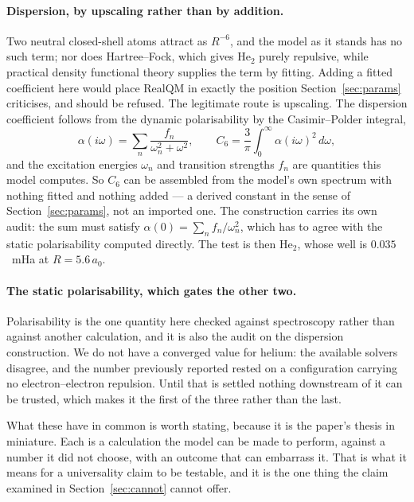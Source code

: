 \documentclass[11pt]{article}
\begin{document}
\paragraph{Dispersion, by upscaling rather than by addition.} Two neutral closed-shell atoms
attract as $R^{-6}$, and the model as it stands has no such term; nor does Hartree--Fock, which
gives He$_2$ purely repulsive, while practical density functional theory supplies the term by
fitting. Adding a fitted coefficient here would place RealQM in exactly the position
Section~\ref{sec:params} criticises, and should be refused. The legitimate route is upscaling. The
dispersion coefficient follows from the dynamic polarisability by the Casimir--Polder integral,
\[
\alpha(i\omega) = \sum_n \frac{f_n}{\omega_n^2 + \omega^2},
\qquad
C_6 = \frac{3}{\pi}\int_0^\infty \alpha(i\omega)^2 \, d\omega ,
\]
and the excitation energies $\omega_n$ and transition strengths $f_n$ are quantities this model
computes. So $C_6$ can be assembled from the model's own spectrum with nothing fitted and nothing
added --- a derived constant in the sense of Section~\ref{sec:params}, not an imported one. The
construction carries its own audit: the sum must satisfy $\alpha(0)=\sum_n f_n/\omega_n^2$, which
has to agree with the static polarisability computed directly. The test is then He$_2$, whose well
is $0.035$~mHa at $R=5.6\,a_0$.

\paragraph{The static polarisability, which gates the other two.} Polarisability is the one
quantity here checked against spectroscopy rather than against another calculation, and it is also
the audit on the dispersion construction. We do not have a converged value for helium: the
available solvers disagree, and the number previously reported rested on a configuration carrying
no electron--electron repulsion. Until that is settled nothing downstream of it can be trusted,
which makes it the first of the three rather than the last.

What these have in common is worth stating, because it is the paper's thesis in miniature. Each is
a calculation the model can be made to perform, against a number it did not choose, with an outcome
that can embarrass it. That is what it means for a universality claim to be testable, and it is the
one thing the claim examined in Section~\ref{sec:cannot} cannot offer.
\end{document}
